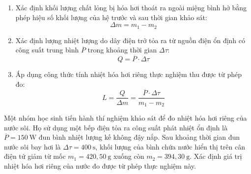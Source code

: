 \begin{phuongphap}
\begin{enumerate}
\item Xác định khối lượng chất lỏng bị hóa hơi thoát ra ngoài miệng bình hở bằng phép hiệu số khối lượng của hệ trước và sau thời gian khảo sát:
\[
\Delta m = m_1 - m_2
\]
\item Xác định lượng nhiệt lượng do dây điện trở tỏa ra từ nguồn điện ổn định có công suất trung bình $\overline{P}$ trong khoảng thời gian $\Delta \tau$:
\[
Q = \overline{P} \cdot \Delta \tau
\]
\item Áp dụng công thức tính nhiệt hóa hơi riêng thực nghiệm thu được từ phép đo:
\[
L = \dfrac{Q}{\Delta m} = \dfrac{\overline{P} \cdot \Delta \tau}{m_1 - m_2}
\]
\end{enumerate}
\end{phuongphap}
\begin{vidumau}
Một nhóm học sinh tiến hành thí nghiệm khảo sát để đo nhiệt hóa hơi riêng của nước sôi. Họ sử dụng một bếp điện tỏa ra công suất phát nhiệt ổn định là $\overline{P} = 150\ \mathrm{W}$ đun bình nhiệt lượng kế không đậy nắp. Sau khoảng thời gian đun nước sôi bay hơi là $\Delta \tau = 400\ \mathrm{s}$, khối lượng của bình chứa nước hiển thị trên cân điện tử giảm từ mốc $m_1 = 420{,}50\ \mathrm{g}$ xuống còn $m_2 = 394{,}30\ \mathrm{g}$. Xác định giá trị nhiệt hóa hơi riêng của nước đo được từ phép thực nghiệm này.
\end{vidumau}

